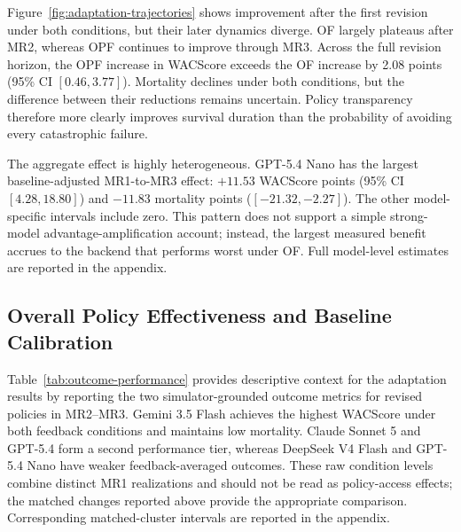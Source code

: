 \documentclass[letterpaper]{article} %
\begin{document}
Figure~\ref{fig:adaptation-trajectories} shows improvement after the first
revision under both conditions, but their later dynamics diverge. OF largely
plateaus after MR2, whereas OPF continues to improve through MR3. Across the
full revision horizon, the OPF increase in WACScore exceeds the OF increase
by 2.08 points (95\% CI $[0.46,3.77]$). Mortality declines under both
conditions, but the difference between their reductions remains uncertain.
Policy transparency therefore more clearly improves survival duration than
the probability of avoiding every catastrophic failure.

The aggregate effect is highly heterogeneous. GPT-5.4 Nano has the largest
baseline-adjusted MR1-to-MR3 effect: $+11.53$ WACScore points (95\% CI
$[4.28,18.80]$) and $-11.83$ mortality points ($[-21.32,-2.27]$). The other
model-specific intervals include zero. This pattern does not support a
simple strong-model advantage-amplification account; instead, the largest
measured benefit accrues to the backend that performs worst under OF. Full
model-level estimates are reported in the appendix.

\subsection{Overall Policy Effectiveness and Baseline Calibration}

Table~\ref{tab:outcome-performance} provides descriptive context for the
adaptation results by reporting the two simulator-grounded outcome metrics
for revised policies in MR2--MR3. Gemini 3.5 Flash achieves the highest
WACScore under both feedback conditions and maintains low mortality. Claude
Sonnet 5 and GPT-5.4 form a second performance tier, whereas DeepSeek V4
Flash and GPT-5.4 Nano have weaker feedback-averaged outcomes. These raw
condition levels combine distinct MR1 realizations and should not be read as
policy-access effects; the matched changes reported above provide the
appropriate comparison. Corresponding matched-cluster intervals are reported
in the appendix.

\end{document}
